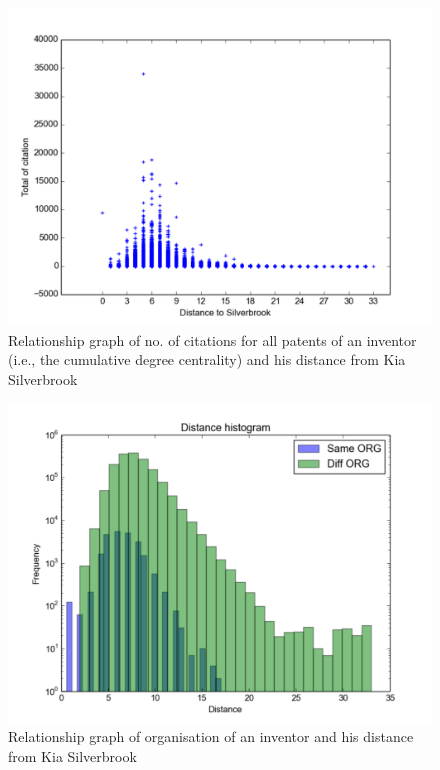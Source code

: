 \begin{figure}[t]
  \includegraphics[scale=0.425]{figure/abc.pdf}
  \caption{ Relationship graph of no. of citations for all patents of an inventor (i.e., the cumulative degree centrality) and his distance from Kia Silverbrook}
\label{fig:distance_citation}
\end{figure}
\begin{figure}[t]
  \includegraphics[scale=0.425]{figure/same_diff_org.pdf}
  \caption{ Relationship graph of organisation of an inventor and his distance from Kia Silverbrook}
\label{fig:same_diff}
\end{figure}

